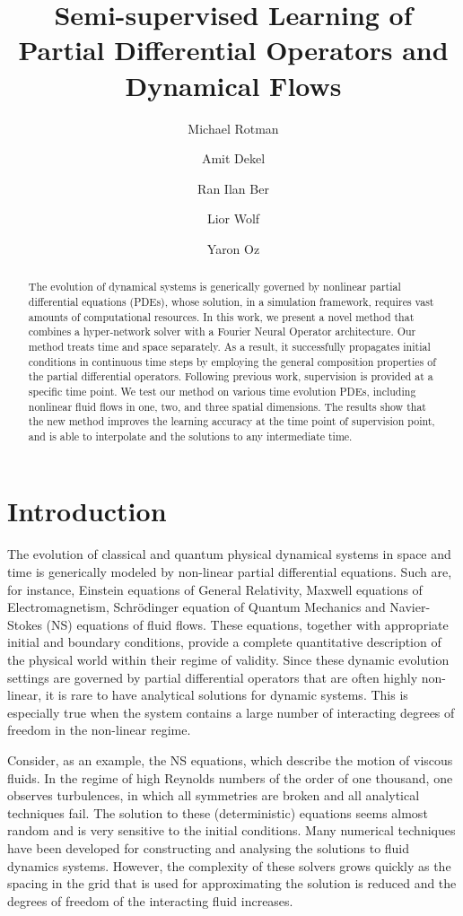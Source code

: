 \documentclass{article}
\title{Semi-supervised Learning of Partial Differential Operators and Dynamical Flows}
\author[1]{Michael Rotman}
\author[2]{Amit Dekel}
\author[3]{Ran Ilan Ber}
\author[1]{Lior Wolf}
\author[4,5]{Yaron Oz}
\affil[1]{\footnotesize School of Computer Science, Tel-Aviv University, Israel}
\affil[2]{\footnotesize Univrses, Sweden}
\affil[3]{\footnotesize K Health, New York, NY}
\affil[4]{\footnotesize School of Physics and Astronomy, Tel-Aviv University, Israel}
\affil[5]{\footnotesize Simons Center for Geometry and Physics, Stony Brook, USA }
\theoremstyle{plain}
\theoremstyle{definition}
\theoremstyle{remark}
\begin{document}
\maketitle

\begin{abstract}
	The evolution of dynamical systems is generically governed by nonlinear partial differential equations (PDEs), whose solution, in a simulation framework, requires vast amounts of computational resources.
In this work, we present a novel method that combines a hyper-network solver with a Fourier Neural Operator architecture. Our method treats time and space separately.
As a result, it successfully propagates initial conditions in continuous time steps by employing the general composition properties of the partial differential operators. 
Following previous work, supervision is provided at a specific time point. We test our method on various time evolution PDEs, including nonlinear fluid flows in one, two, and three spatial dimensions. The results show that the new method improves the learning accuracy at the time point of supervision point, and is able to interpolate and the solutions to any intermediate time.
\end{abstract}

\section{Introduction}

The evolution of classical and quantum physical dynamical systems in space and time is generically modeled by non-linear partial differential
equations. Such are, for instance, Einstein equations of General Relativity, Maxwell equations of Electromagnetism, 
Schr\"{o}dinger equation of Quantum Mechanics and Navier-Stokes (NS) equations of fluid flows.
These equations, together with appropriate initial and boundary conditions, provide
a complete quantitative description of the physical world within their regime of validity.
Since these dynamic evolution settings are governed by partial differential operators that are often highly non-linear, it is rare to have analytical solutions for dynamic systems. 
This is especially true when the system contains a large number of interacting degrees of freedom in the non-linear regime.

Consider, as an example, the NS equations, which describe the motion of viscous fluids. In the regime of high Reynolds numbers of the order of one thousand, one observes turbulences, in which all symmetries are broken and all analytical techniques fail. The solution to these (deterministic) equations seems almost  random and is very sensitive to the initial conditions. Many numerical techniques have been developed for constructing and analysing the solutions to fluid dynamics systems. However, the complexity of these solvers grows quickly as the spacing in the grid that is used for approximating the solution is reduced and the degrees of freedom of the interacting fluid increases.
\end{document}
